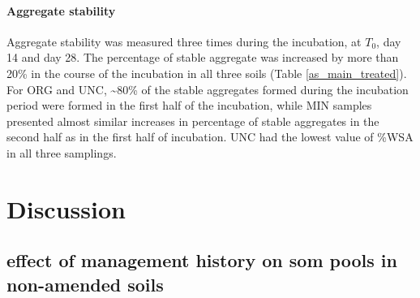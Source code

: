 \documentclass[12pt]{report}
\begin{document}
		
		
		
		
		\subsubsection{Aggregate stability}
		
		Aggregate stability was measured three times during the incubation, at $ T_0 $, day 14 and day 28. The percentage of stable aggregate was increased by more than 20\% in the course of the incubation in all three soils (Table \ref{as_main_treated}). For ORG and UNC, \~{}80\% of the stable aggregates formed during the incubation period were formed in the first half of the incubation, while MIN samples presented almost similar increases in percentage of stable aggregates in the second half as in the first half of incubation. UNC had the lowest value of \%WSA in all three samplings.\\
		
		
		
		
		

	\chapter{Discussion}
		
		
		
		
		\section{effect of management history on \gls{som} pools in non-amended soils}
		
\end{document}
